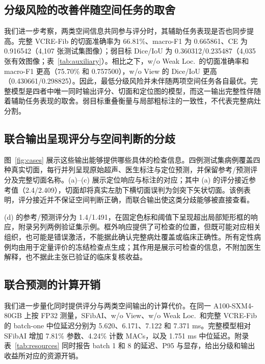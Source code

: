 \subsection{分级风险的改善伴随空间任务的取舍}
我们进一步考察，两类空间信息共同参与评分时，其辅助任务表现是否也同步提高。完整 VCRE-Fib 的切面准确率为 66.81\%、macro-F1 为 0.665861、CE 为 0.916542（4,107 张测试集图像）；弱目标 Dice/IoU 为 0.360312/0.235487（4,035 张有效图像；表~\ref{tab:auxiliary}）。相比之下，w/o Weak Loc.\ 的切面准确率和 macro-F1 更高（75.70\% 和 0.757500），w/o View 的 Dice/IoU 更高（0.430661/0.298825）。因此，最低分级风险并未伴随两项空间任务各自最优。完整模型是四者中唯一同时输出评分、切面和定位图的模型，而这一输出完整性伴随着辅助任务表现的取舍。弱目标重叠衡量与局部粗标注的一致性，不代表完整病灶分割。

\subsection{联合输出呈现评分与空间判断的分歧}
图~\ref{fig:cases} 展示这些输出能够提供哪些具体的检查信息。四例测试集病例覆盖四种真实切面，每行并列呈现原始超声、医生标注与定位预测，并保留参考/预测评分及完整切面名称。(a)--(c) 展示定位响应与标注的对应；其中 (a) 的评分接近参考值（2.4/2.409），切面却将真实左肋下横切面误判为剑突下矢状切面。该例表明，评分接近并不保证空间判断正确，而联合输出使这类分歧能够被直接查看。

(d) 的参考/预测评分为 1.4/1.491，在固定色标和阈值下呈现超出局部矩形框的响应，附录另列两例验证集示例。框外响应提供了可检查的位置，但既可能对应相关组织，也可能是错误激活，不能据此确认完整病灶覆盖或临床正确性。所有定性病例均由用于定量评价的冻结检查点生成；其作用是展示可检查的信息，不附加医生解释，也不据此主张已验证的临床复核收益。


\subsection{联合预测的计算开销}
我们进一步量化同时提供评分与两类空间输出的计算代价。在同一 A100-SXM4-80GB 上按 FP32 测量，SFibAI、w/o View、w/o Weak Loc.\ 和完整 VCRE-Fib 的 batch-one 中位延迟分别为 5.620、6.171、7.122 和 7.371 ms。完整模型相对 SFibAI 增加 7.81\% 参数、4.24\% 计数 MACs，以及 1.751 ms 中位延迟。附录表~\ref{tab:resources} 同时报告 batch 1 和 8 的延迟、P95 与显存，给出分级和输出收益所对应的资源开销。
